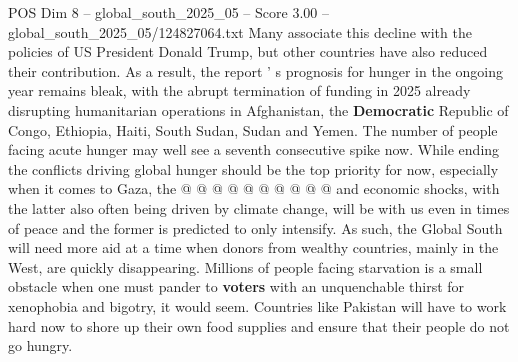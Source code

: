 \begin{textsample}{POS Dim 8 – global\_south\_2025\_05 – Score 3.00 – global\_south\_2025\_05/124827064.txt}
Many associate this decline with the policies of US President Donald Trump, but other countries have also reduced their contribution.
As a result, the report ' s prognosis for hunger in the ongoing year remains bleak, with the abrupt termination of funding in 2025 already disrupting humanitarian operations in Afghanistan, the \textbf{Democratic} Republic of Congo, Ethiopia, Haiti, South Sudan, Sudan and Yemen.
The number of people facing acute hunger may well see a seventh consecutive spike now.
While ending the conflicts driving global hunger should be the top priority for now, especially when it comes to Gaza, the @ @ @ @ @ @ @ @ @ @ and economic shocks, with the latter also often being driven by climate change, will be with us even in times of peace and the former is predicted to only intensify.
As such, the Global South will need more aid at a time when donors from wealthy countries, mainly in the West, are quickly disappearing.
Millions of people facing starvation is a small obstacle when one must pander to \textbf{voters} with an unquenchable thirst for xenophobia and bigotry, it would seem.
Countries like Pakistan will have to work hard now to shore up their own food supplies and ensure that their people do not go hungry.

\end{textsample}
